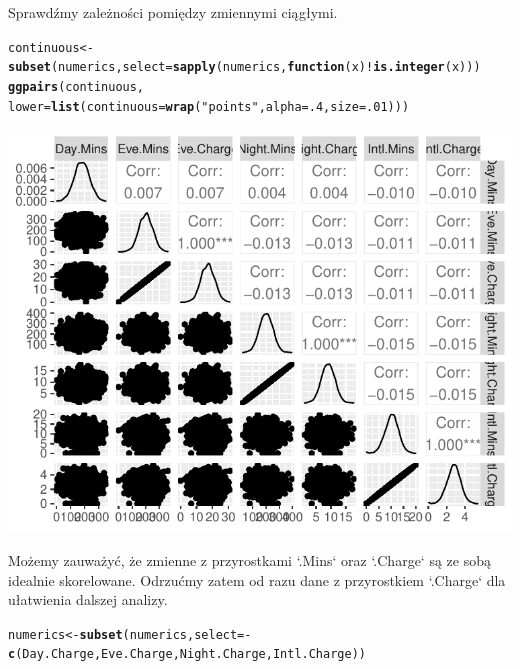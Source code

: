 \documentclass{article}\usepackage[]{graphicx}\usepackage[]{color}
\makeatletter
\def\maxwidth{ %
  \ifdim\Gin@nat@width>\linewidth
    \linewidth
  \else
    \Gin@nat@width
  \fi
}
\newcommand{\hlnum}[1]{\textcolor[rgb]{0.686,0.059,0.569}{#1}}%
\newcommand{\hlstr}[1]{\textcolor[rgb]{0.192,0.494,0.8}{#1}}%
\newcommand{\hlopt}[1]{\textcolor[rgb]{0,0,0}{#1}}%
\newcommand{\hlstd}[1]{\textcolor[rgb]{0.345,0.345,0.345}{#1}}%
\newcommand{\hlkwa}[1]{\textcolor[rgb]{0.161,0.373,0.58}{\textbf{#1}}}%
\newcommand{\hlkwb}[1]{\textcolor[rgb]{0.69,0.353,0.396}{#1}}%
\newcommand{\hlkwc}[1]{\textcolor[rgb]{0.333,0.667,0.333}{#1}}%
\newcommand{\hlkwd}[1]{\textcolor[rgb]{0.737,0.353,0.396}{\textbf{#1}}}%
\newenvironment{kframe}{%
 \def\at@end@of@kframe{}%
 \ifinner\ifhmode%
  \def\at@end@of@kframe{\end{minipage}}%
  \begin{minipage}{\columnwidth}%
 \fi\fi%
 \def\FrameCommand##1{\hskip\@totalleftmargin \hskip-\fboxsep
 \colorbox{shadecolor}{##1}\hskip-\fboxsep
     \hskip-\linewidth \hskip-\@totalleftmargin \hskip\columnwidth}%
 \MakeFramed {\advance\hsize-\width
   \@totalleftmargin\z@ \linewidth\hsize
   \@setminipage}}%
 {\par\unskip\endMakeFramed%
 \at@end@of@kframe}
\newenvironment{knitrout}{}{} %
\makeatother
\begin{document}
Sprawdźmy zależności pomiędzy zmiennymi ciągłymi.
\begin{knitrout}
\color{fgcolor}\begin{kframe}
\begin{alltt}
\hlstd{continuous} \hlkwb{<-} \hlkwd{subset}\hlstd{(numerics,} \hlkwc{select}\hlstd{=}\hlkwd{sapply}\hlstd{(numerics,} \hlkwa{function}\hlstd{(}\hlkwc{x}\hlstd{)} \hlopt{!}\hlkwd{is.integer}\hlstd{(x)))}
\hlkwd{ggpairs}\hlstd{(continuous,}
        \hlkwc{lower}\hlstd{=}\hlkwd{list}\hlstd{(}\hlkwc{continuous}\hlstd{=}\hlkwd{wrap}\hlstd{(}\hlstr{"points"}\hlstd{,} \hlkwc{alpha}\hlstd{=}\hlnum{.4}\hlstd{,} \hlkwc{size}\hlstd{=}\hlnum{.01}\hlstd{)))}
\end{alltt}
\end{kframe}

{\centering \includegraphics[width=\maxwidth]{figure/Pair_plot_for_continuous_variables-1} 

}



\end{knitrout}
Możemy zauważyć, że zmienne z przyrostkami `.Mins` oraz `.Charge` są ze sobą idealnie skorelowane. Odrzućmy zatem od razu dane z przyrostkiem `.Charge` dla ułatwienia dalszej analizy.

\begin{knitrout}
\color{fgcolor}\begin{kframe}
\begin{alltt}
\hlstd{numerics} \hlkwb{<-} \hlkwd{subset}\hlstd{(numerics,} \hlkwc{select}\hlstd{=}\hlopt{-}\hlkwd{c}\hlstd{(Day.Charge, Eve.Charge, Night.Charge, Intl.Charge))}
\end{alltt}
\end{kframe}
\end{knitrout}
\end{document}
